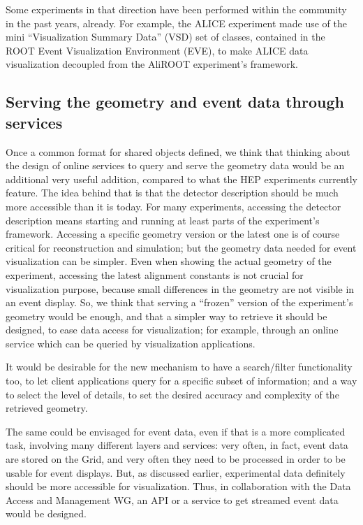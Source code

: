 \documentclass[12pt,a4paper]{article}
\begin{document}
Some experiments in that direction have been performed within the community in the past years, already. For example,
the ALICE experiment made use of the mini “Visualization Summary Data” (VSD) set of classes, contained in the ROOT Event
Visualization Environment (EVE), to make ALICE data visualization decoupled from the AliROOT experiment’s framework.

\hypertarget{serving-data}{%
\subsection{Serving the geometry and event data through services}\label{serving-data}}

Once a common format for shared objects defined, we think that thinking about the design of online services to query and
serve the geometry data would be an additional very useful addition, compared to what the HEP experiments currently feature.
The idea behind that is that the detector description should be much more accessible than it is today. For many experiments,
accessing the detector description means starting and running at least parts of the experiment’s framework. Accessing a specific
geometry version or the latest one is of course critical for reconstruction and simulation; but the geometry data needed for
event visualization can be simpler. Even when showing the actual geometry of the experiment, accessing the latest alignment
constants is not crucial for visualization purpose, because small differences in the geometry are not visible in an event display.
So, we think that serving a “frozen” version of the experiment’s geometry would be enough, and that a simpler way to retrieve
it should be designed, to ease data access for visualization; for example, through an online service which can be queried by
visualization applications.

It would be desirable for the new mechanism to have a search/filter functionality too, to let client applications query
for a specific subset of information; and a way to select the level of details, to set the desired accuracy and complexity
of the retrieved geometry.

The same could be envisaged for event data, even if that is a more complicated task, involving many different layers and services:
very often, in fact, event data are stored on the Grid, and very often they need to be processed in order to be usable for event displays.
But, as discussed earlier, experimental data definitely should be more accessible for visualization. Thus, in collaboration with
the Data Access and Management WG, an API or a service to get streamed event data would be designed.
\end{document}
